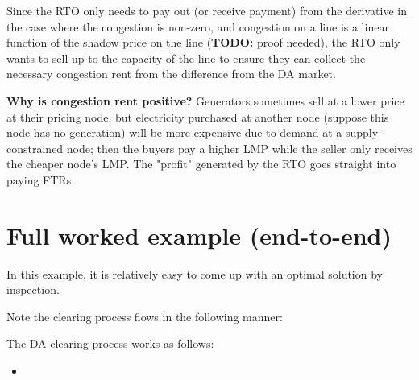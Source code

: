 \documentclass[11pt]{article}
\begin{document}
Since the RTO only needs to pay out (or receive payment) from the derivative in the case where the congestion is non-zero, and congestion on a line is a linear function of the shadow price on the line (\textbf{TODO:} proof needed), the RTO only wants to sell up to the capacity of the line to ensure they can collect the necessary congestion rent from the difference from the DA market.

\textbf{Why is congestion rent positive? } Generators sometimes sell at a lower price at their pricing node, but electricity purchased at another node (suppose this node has no generation) will be more expensive due to demand at a supply-constrained node; then the buyers pay a higher LMP while the seller only receives the cheaper node's LMP. The "profit" generated by the RTO goes straight into paying FTRs.

\section{Full worked example (end-to-end)}
In this example, it is relatively easy to come up with an optimal solution by inspection.

Note the clearing process flows in the following manner:

\begin{center}
\end{center}

The DA clearing process works as follows:

\begin{itemize}
    \item \textbf{}
\end{itemize}
\end{document}
